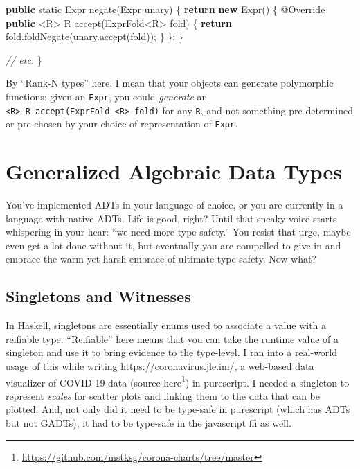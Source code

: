\documentclass[]{article}
\newenvironment{Shaded}{}{}
\newcommand{\AttributeTok}[1]{\textcolor[rgb]{0.49,0.56,0.16}{#1}}
\newcommand{\CommentTok}[1]{\textcolor[rgb]{0.38,0.63,0.69}{\textit{#1}}}
\newcommand{\ControlFlowTok}[1]{\textcolor[rgb]{0.00,0.44,0.13}{\textbf{#1}}}
\newcommand{\DataTypeTok}[1]{\textcolor[rgb]{0.56,0.13,0.00}{#1}}
\newcommand{\FunctionTok}[1]{\textcolor[rgb]{0.02,0.16,0.49}{#1}}
\newcommand{\KeywordTok}[1]{\textcolor[rgb]{0.00,0.44,0.13}{\textbf{#1}}}
\newcommand{\NormalTok}[1]{#1}
\newcommand{\OperatorTok}[1]{\textcolor[rgb]{0.40,0.40,0.40}{#1}}
\renewcommand{\href}[2]{#2\footnote{\url{#1}}}
\begin{document}
\begin{Shaded}
\begin{Highlighting}[]
    \KeywordTok{public} \DataTypeTok{static}\NormalTok{ Expr }\FunctionTok{negate}\OperatorTok{(}\NormalTok{Expr unary}\OperatorTok{)} \OperatorTok{\{}
        \ControlFlowTok{return} \KeywordTok{new} \FunctionTok{Expr}\OperatorTok{()} \OperatorTok{\{}
            \AttributeTok{@Override}
            \KeywordTok{public} \OperatorTok{\textless{}}\NormalTok{R}\OperatorTok{\textgreater{}}\NormalTok{ R }\FunctionTok{accept}\OperatorTok{(}\NormalTok{ExprFold}\OperatorTok{\textless{}}\NormalTok{R}\OperatorTok{\textgreater{}}\NormalTok{ fold}\OperatorTok{)} \OperatorTok{\{}
                \ControlFlowTok{return}\NormalTok{ fold}\OperatorTok{.}\FunctionTok{foldNegate}\OperatorTok{(}\NormalTok{unary}\OperatorTok{.}\FunctionTok{accept}\OperatorTok{(}\NormalTok{fold}\OperatorTok{));}
            \OperatorTok{\}}
        \OperatorTok{\};}
    \OperatorTok{\}}

    \CommentTok{// etc.}
\OperatorTok{\}}
\end{Highlighting}
\end{Shaded}

By ``Rank-N types'' here, I mean that your objects can generate polymorphic
functions: given an \texttt{Expr}, you could \emph{generate} an
\texttt{\textless{}R\textgreater{}\ R\ accept(ExprFold\ \textless{}R\textgreater{}\ fold)}
for any \texttt{R}, and not something pre-determined or pre-chosen by your
choice of representation of \texttt{Expr}.

\section{Generalized Algebraic Data
Types}\label{generalized-algebraic-data-types}

You've implemented ADTs in your language of choice, or you are currently in a
language with native ADTs. Life is good, right? Until that sneaky voice starts
whispering in your hear: ``we need more type safety.'' You resist that urge,
maybe even get a lot done without it, but eventually you are compelled to give
in and embrace the warm yet harsh embrace of ultimate type safety. Now what?

\subsection{Singletons and Witnesses}\label{singletons-and-witnesses}

In Haskell, singletons are essentially enums used to associate a value with a
reifiable type. ``Reifiable'' here means that you can take the runtime value of
a singleton and use it to bring evidence to the type-level. I ran into a
real-world usage of this while writing \url{https://coronavirus.jle.im/}, a
web-based data visualizer of COVID-19 data
(\href{https://github.com/mstksg/corona-charts/tree/master}{source here}) in
purescript. I needed a singleton to represent \emph{scales} for scatter plots
and linking them to the data that can be plotted. And, not only did it need to
be type-safe in purescript (which has ADTs but not GADTs), it had to be
type-safe in the javascript ffi as well.
\end{document}
